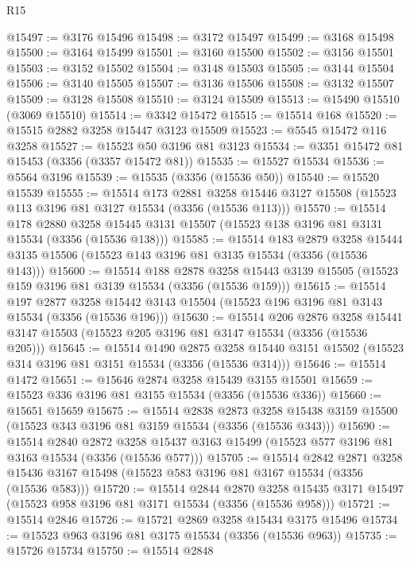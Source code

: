 \begin{lexlean}{R15}
\begin{coremodule}
@15497 := @3176 @15496
@15498 := @3172 @15497
@15499 := @3168 @15498
@15500 := @3164 @15499
@15501 := @3160 @15500
@15502 := @3156 @15501
@15503 := @3152 @15502
@15504 := @3148 @15503
@15505 := @3144 @15504
@15506 := @3140 @15505
@15507 := @3136 @15506
@15508 := @3132 @15507
@15509 := @3128 @15508
@15510 := @3124 @15509
@15513 := @15490 @15510 (@3069 @15510)
@15514 := @3342 @15472
@15515 := @15514 @168
@15520 := @15515 @2882 @3258 @15447 @3123 @15509
@15523 := @5545 @15472 @116 @3258
@15527 := @15523 @50 @3196 @81 @3123
@15534 := @3351 @15472 @81 @15453 (@3356 (@3357 @15472 @81))
@15535 := @15527 @15534
@15536 := @5564 @3196
@15539 := @15535 (@3356 (@15536 @50))
@15540 := @15520 @15539
@15555 := @15514
    @173
    @2881
    @3258
    @15446
    @3127
    @15508
    (@15523 @113 @3196 @81 @3127 @15534 (@3356 (@15536 @113)))
@15570 := @15514
    @178
    @2880
    @3258
    @15445
    @3131
    @15507
    (@15523 @138 @3196 @81 @3131 @15534 (@3356 (@15536 @138)))
@15585 := @15514
    @183
    @2879
    @3258
    @15444
    @3135
    @15506
    (@15523 @143 @3196 @81 @3135 @15534 (@3356 (@15536 @143)))
@15600 := @15514
    @188
    @2878
    @3258
    @15443
    @3139
    @15505
    (@15523 @159 @3196 @81 @3139 @15534 (@3356 (@15536 @159)))
@15615 := @15514
    @197
    @2877
    @3258
    @15442
    @3143
    @15504
    (@15523 @196 @3196 @81 @3143 @15534 (@3356 (@15536 @196)))
@15630 := @15514
    @206
    @2876
    @3258
    @15441
    @3147
    @15503
    (@15523 @205 @3196 @81 @3147 @15534 (@3356 (@15536 @205)))
@15645 := @15514
    @1490
    @2875
    @3258
    @15440
    @3151
    @15502
    (@15523 @314 @3196 @81 @3151 @15534 (@3356 (@15536 @314)))
@15646 := @15514 @1472
@15651 := @15646 @2874 @3258 @15439 @3155 @15501
@15659 := @15523 @336 @3196 @81 @3155 @15534 (@3356 (@15536 @336))
@15660 := @15651 @15659
@15675 := @15514
    @2838
    @2873
    @3258
    @15438
    @3159
    @15500
    (@15523 @343 @3196 @81 @3159 @15534 (@3356 (@15536 @343)))
@15690 := @15514
    @2840
    @2872
    @3258
    @15437
    @3163
    @15499
    (@15523 @577 @3196 @81 @3163 @15534 (@3356 (@15536 @577)))
@15705 := @15514
    @2842
    @2871
    @3258
    @15436
    @3167
    @15498
    (@15523 @583 @3196 @81 @3167 @15534 (@3356 (@15536 @583)))
@15720 := @15514
    @2844
    @2870
    @3258
    @15435
    @3171
    @15497
    (@15523 @958 @3196 @81 @3171 @15534 (@3356 (@15536 @958)))
@15721 := @15514 @2846
@15726 := @15721 @2869 @3258 @15434 @3175 @15496
@15734 := @15523 @963 @3196 @81 @3175 @15534 (@3356 (@15536 @963))
@15735 := @15726 @15734
@15750 := @15514
    @2848

\end{coremodule}
\end{lexlean}
